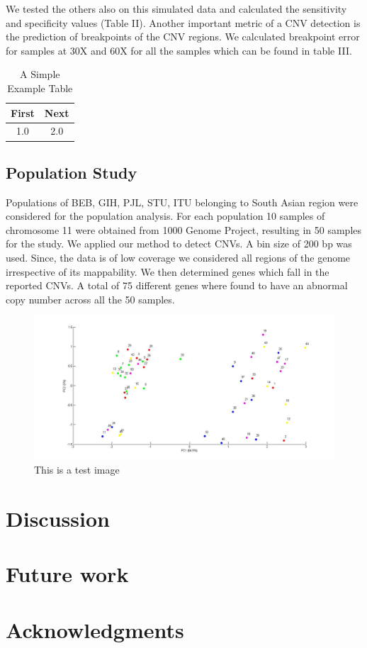 \documentclass[twocolumn,oneside,conference]
{IEEEtran}
\begin{document}
\par We tested the others also on this simulated data and calculated the sensitivity and specificity values (Table II). Another important metric of a CNV detection is the prediction of breakpoints of the CNV regions. We calculated breakpoint error for samples at 30X and 60X for all the samples which can be found in table III.  

\begin{table}[!h]
\renewcommand{\arraystretch}{1.3}
\caption{A Simple Example Table}
\label{table_example}
\centering
\begin{tabular}{c||c}
\hline
\bfseries First & \bfseries Next\\
\hline\hline
1.0 & 2.0\\
\hline
\end{tabular}
\end{table}

\subsection{Population Study}
Populations of BEB, GIH, PJL, STU, ITU belonging to South Asian region were considered for the population analysis. For each population 10 samples of chromosome 11 were obtained from 1000 Genome Project, resulting in 50 samples for the study. We applied our method to detect CNVs. A bin size of 200 bp was used. Since, the data is of low coverage we considered all regions of the genome irrespective of its mappability. We then determined genes which fall in the reported CNVs. A total of 75  different genes where found to have an abnormal copy number across all the 50 samples.        


\begin{figure}[h]
	\includegraphics[width=\textwidth]{final.jpg}
	\caption{This is a test image}
	\label{fig1: this is test image}
\end{figure}

\section{Discussion}

\section{Future work}

\section*{Acknowledgments}


\printbibliography
\end{document}
